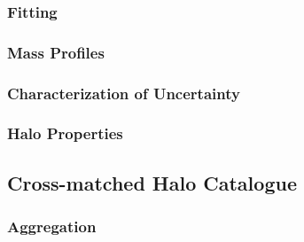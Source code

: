 \subsubsection{Fitting}
\label{subsubsec:analysis--density_profile--fitting}



\subsubsection{Mass Profiles}
\label{subsubsec:analysis--density_profile--mass_profiles}



\subsubsection{Characterization of Uncertainty}
\label{subsubsec:analysis--density_profile--uncertainty}



\subsubsection{Halo Properties}
\label{subsubsec:analysis--density_profile--halo_properties}




\subsection{Cross-matched Halo Catalogue}
\label{subsec:analysis--catalogue}



\subsubsection{Aggregation}
\label{subsubsec:analysis--catalogue--aggregation}




